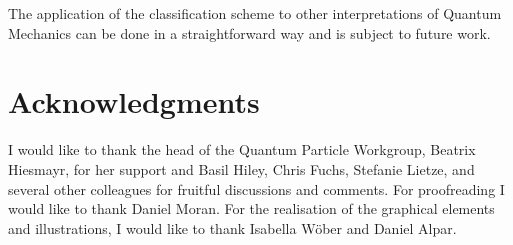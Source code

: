 \documentclass{article}
\begin{document}
The application of the classification scheme to other interpretations of Quantum Mechanics can be done in a straightforward way and is subject to future work.  

\section{Acknowledgments}

I would like to thank the head of the Quantum Particle Workgroup, Beatrix Hiesmayr, for her support and Basil Hiley, Chris Fuchs, Stefanie Lietze, and several other colleagues for fruitful discussions and comments. For proofreading I would like to thank Daniel Moran. For the realisation of the graphical elements and illustrations, I would like to thank Isabella W\"ober and Daniel Alpar.


\end{document}
